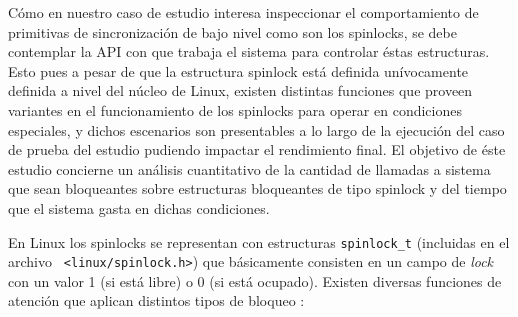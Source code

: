 Cómo en nuestro caso de estudio interesa inspeccionar el comportamiento de primitivas de sincronización de bajo nivel como son los spinlocks, se debe contemplar la API con que trabaja el sistema para controlar éstas estructuras. Esto pues a pesar de que la estructura spinlock está definida unívocamente definida a nivel del núcleo de Linux, existen distintas funciones que proveen variantes en el funcionamiento de los spinlocks para operar en condiciones especiales, y dichos escenarios son presentables a lo largo de la ejecución del caso de prueba del estudio pudiendo impactar el rendimiento final. El objetivo de éste estudio concierne un análisis cuantitativo de la cantidad de llamadas a sistema que sean bloqueantes sobre estructuras bloqueantes de tipo spinlock y del tiempo que el sistema gasta en dichas condiciones.

En Linux los spinlocks se representan con estructuras \verb=spinlock_t= (incluidas en el archivo \verb= <linux/spinlock.h>=) que básicamente consisten en un campo de \emph{lock} con un valor 1 (si está libre) o 0 (si está ocupado). Existen diversas funciones de atención que aplican distintos tipos de bloqueo \cite{book:spinlocks}:

